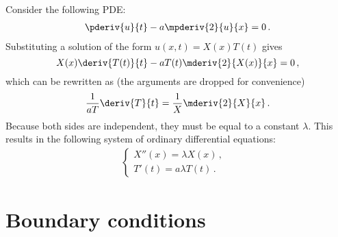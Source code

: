     \begin{example}
        Consider the following PDE:
        \begin{gather}
            \pderiv{u}{t} - a\mpderiv{2}{u}{x} = 0\,.
        \end{gather}
        Substituting a solution of the form $u(x,t) = X(x)T(t)$ gives \[X(x)\deriv{T(t)}{t} - aT(t)\mderiv{2}{X(x)}{x} = 0\,,\] which can be rewritten as (the arguments are dropped for convenience) \[\frac{1}{aT}\deriv{T}{t} = \frac{1}{X}\mderiv{2}{X}{x}\,.\] Because both sides are independent, they must be equal to a constant $\lambda$. This results in the following system of ordinary differential equations:
        \begin{gather}
            \begin{cases}
                X''(x) = \lambda X(x)\,,&\\
                T'(t) = a\lambda T(t)\,.&
            \end{cases}
        \end{gather}
    \end{example}

\section{Boundary conditions}


